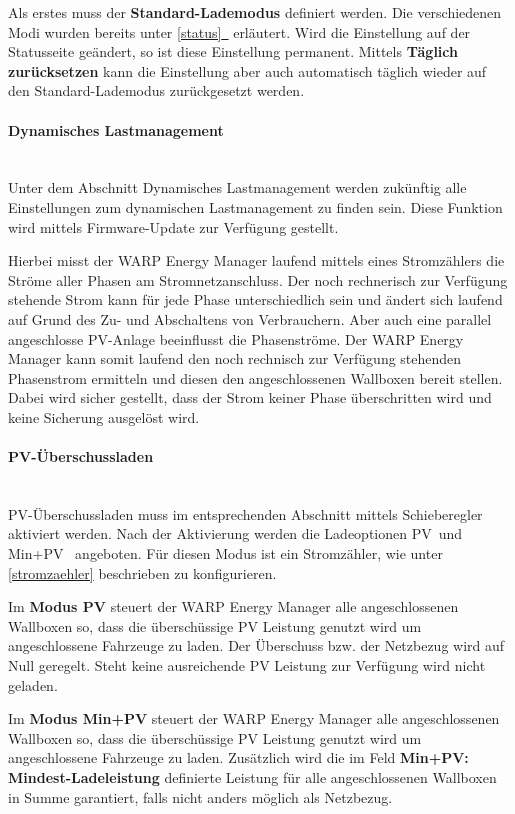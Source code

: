 \documentclass[a4paper,10pt]{article}
\newcommand*{\fullref}[1]{\hyperref[{#1}]{\ref*{#1}~\nameref*{#1}}}
\begin{document}
\begin{multicols*}{2}
	Als erstes muss der \textbf{Standard-Lademodus} definiert werden. Die
	verschiedenen Modi wurden bereits unter \fullref{status} erläutert. 
	Wird die Einstellung auf der Statusseite geändert, so ist diese Einstellung permanent.
	Mittels \textbf{Täglich zurücksetzen} kann die Einstellung aber auch 
	automatisch täglich wieder auf den Standard-Lademodus zurückgesetzt werden.

	\paragraph{Dynamisches Lastmanagement}\ \\
	Unter dem Abschnitt Dynamisches Lastmanagement werden zukünftig
	alle Einstellungen zum dynamischen Lastmanagement zu finden sein. Diese
	Funktion wird mittels Firmware-Update zur Verfügung gestellt.

	Hierbei misst der WARP Energy Manager laufend mittels eines Stromzählers die
	Ströme aller Phasen am Stromnetzanschluss. Der noch rechnerisch zur
	Verfügung stehende Strom kann für jede Phase unterschiedlich sein und ändert
	sich laufend auf Grund des Zu- und Abschaltens von Verbrauchern. Aber auch eine
	parallel angeschlosse PV-Anlage beeinflusst die Phasenströme. Der WARP
	Energy Manager kann somit laufend den noch rechnisch zur Verfügung stehenden
	Phasenstrom ermitteln und diesen den angeschlossenen Wallboxen bereit
	stellen. Dabei wird sicher gestellt, dass der Strom keiner Phase
	überschritten wird und keine Sicherung ausgelöst wird.

	\paragraph{PV-Überschussladen}\ \\
	PV-Überschussladen muss im entsprechenden Abschnitt mittels
	Schieberegler aktiviert werden. Nach der Aktivierung werden die Ladeoptionen
	\glqq PV\grqq~und \glqq Min+PV\grqq~ angeboten. Für diesen Modus ist ein
	Stromzähler, wie unter \ref{stromzaehler} beschrieben zu konfigurieren.

	Im \textbf{Modus \glqq PV\grqq}
	steuert der WARP Energy Manager alle angeschlossenen Wallboxen so, dass die
	überschüssige PV Leistung genutzt wird um angeschlossene Fahrzeuge zu laden.
	Der Überschuss bzw. der Netzbezug wird auf Null geregelt. Steht keine
	ausreichende PV Leistung zur Verfügung wird nicht geladen.

	Im \textbf{Modus \glqq Min+PV\grqq}
	steuert der WARP Energy Manager alle angeschlossenen Wallboxen so, dass die
	überschüssige PV Leistung genutzt wird um angeschlossene Fahrzeuge zu laden.
	Zusätzlich wird die im Feld \textbf{\glqq Min+PV:
	Mindest-Ladeleistung\grqq} definierte Leistung für alle angeschlossenen
	Wallboxen in Summe garantiert, falls nicht anders möglich als Netzbezug.


\end{multicols*}
\end{document}
